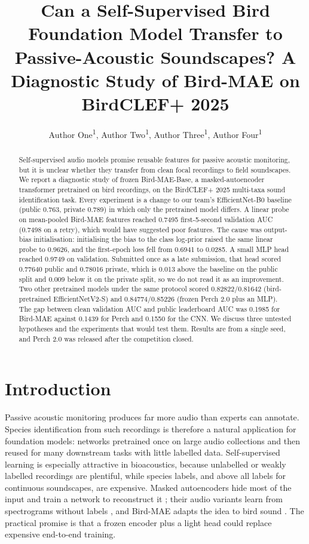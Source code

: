 \documentclass[letterpaper]{article} %
\title{Can a Self-Supervised Bird Foundation Model Transfer to Passive-Acoustic Soundscapes? A Diagnostic Study of Bird-MAE on BirdCLEF+ 2025}
\author{
    Author One\textsuperscript{\rm 1},
    Author Two\textsuperscript{\rm 1},
    Author Three\textsuperscript{\rm 1},
    Author Four\textsuperscript{\rm 1}
}
\begin{document}
\maketitle

\begin{abstract}
Self-supervised audio models promise reusable features for passive acoustic monitoring, but it is unclear whether they transfer from clean focal recordings to field soundscapes. We report a diagnostic study of frozen Bird-MAE-Base, a masked-autoencoder transformer pretrained on bird recordings, on the BirdCLEF+ 2025 multi-taxa sound identification task. Every experiment is a change to our team's EfficientNet-B0 baseline (public 0.763, private 0.789) in which only the pretrained model differs. A linear probe on mean-pooled Bird-MAE features reached 0.7495 first-5-second validation AUC (0.7498 on a retry), which would have suggested poor features. The cause was output-bias initialisation: initialising the bias to the class log-prior raised the same linear probe to 0.9626, and the first-epoch loss fell from 0.6941 to 0.0285. A small MLP head reached 0.9749 on validation. Submitted once as a late submission, that head scored 0.77640 public and 0.78016 private, which is 0.013 above the baseline on the public split and 0.009 below it on the private split, so we do not read it as an improvement. Two other pretrained models under the same protocol scored 0.82822/0.81642 (bird-pretrained EfficientNetV2-S) and 0.84774/0.85226 (frozen Perch 2.0 plus an MLP). The gap between clean validation AUC and public leaderboard AUC was 0.1985 for Bird-MAE against 0.1439 for Perch and 0.1550 for the CNN. We discuss three untested hypotheses and the experiments that would test them. Results are from a single seed, and Perch 2.0 was released after the competition closed.
\end{abstract}

\section{Introduction}
Passive acoustic monitoring produces far more audio than experts can annotate. Species identification from such recordings is therefore a natural application for foundation models: networks pretrained once on large audio collections and then reused for many downstream tasks with little labelled data. Self-supervised learning is especially attractive in bioacoustics, because unlabelled or weakly labelled recordings are plentiful, while species labels, and above all labels for continuous soundscapes, are expensive. Masked autoencoders hide most of the input and train a network to reconstruct it \citep{he2021masked}; their audio variants learn from spectrograms without labels \citep{huang2022masked}, and Bird-MAE adapts the idea to bird sound \citep{rauch2025can}. The practical promise is that a frozen encoder plus a light head could replace expensive end-to-end training.
\end{document}
